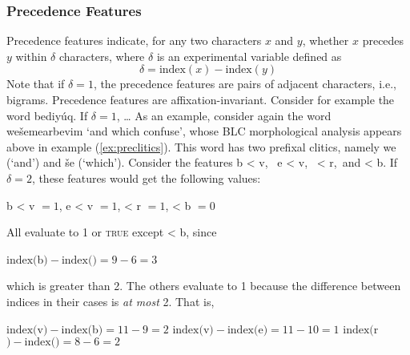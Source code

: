 \subsubsection{Precedence Features}
Precedence features indicate, for any two characters $x$ and $y$,
whether $x$ precedes $y$ within $\delta$ characters,
where $\delta$ is an experimental variable defined as
	\begin{equation}\label{eq:indexdif}
	\delta = \text{index}(x) - \text{index}(y)
	\end{equation}
Note that if $\delta = 1$, the precedence features are pairs of adjacent 
characters, i.e., bigrams.
Precedence features are affixation-invariant. 
Consider for example 
the word \textsf{bediy\'uq}. If $\delta = 1$, \dots 
As an example, consider again the word \textsf{we\v{s}emearbevim} `and which confuse', whose BLC morphological 
analysis appears above in example (\ref{ex:preclitics}). This word has two prefixal clitics, namely \textsf{we} 
(`and') and \textsf{\v{s}e} (`which'). %
Consider the features \textsf{b < v}, \, \textsf{e < v}, \,\textsf{ < r},\, and \textsf{ < b}. If $\delta=2$, these features would get the 
following values: 
\begin{exe}	
	\ex \textsf{b < v} $ =1 $, \qquad \textsf{e < v} $ =1 $, \qquad\textsf{ < r} $ =1$, \qquad \textsf{< b} $=0$
\end{exe}

All evaluate to 1 or \textsc{true} except \textsf{ < b}, since
\begin{exe}
	\ex $\text{index}($\textsf{b}$) - \text{index}($\textsf{\textrevglotstop}$) = 9 - 6 = 3$
\end{exe}
which is greater than 2.
The others evaluate to 1 because the difference between indices in their cases is \emph{at most} 2. That is,
\begin{exe}
    \ex \begin{xlist}
	\ex $\text{index}($\textsf{v}$) - \text{index}($\textsf{b}$) = 11 - 9 = 2$ 
	\ex $\text{index}($\textsf{v}$) - \text{index}($\textsf{e}$) = 11 - 10 = 1$ 
	\ex $\text{index}($\textsf{r}$) - \text{index}($\textsf{\textrevglotstop}$) = 8 - 6 = 2 $
    \end{xlist}
\end{exe}


